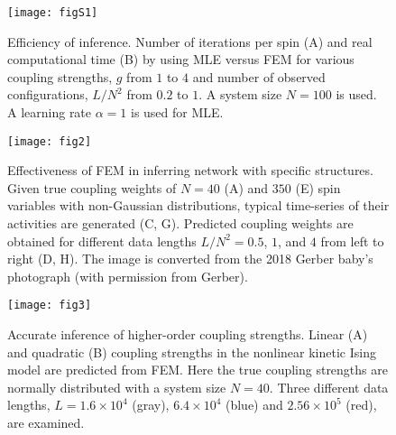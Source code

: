 \documentclass[prx,twocolumn,twoside,showpacs,superscriptaddress]{revtex4-1}
\begin{document}
\begin{figure}[h]
\centering
\texttt{[image: figS1]}
\caption{ \label{fig:figS1} Efficiency of inference. Number of iterations per spin (A) and real computational time (B) by using MLE versus FEM for various coupling strengths, $g$ from $1$ to $4$ and number of observed configurations, $L/N^2$ from $0.2$ to $1$. A system size $N=100$ is used. A learning rate $\alpha=1$ is used for MLE.
}
\end{figure}

\begin{figure*}
\centering
\texttt{[image: fig2]}
\caption{ \label{fig:fig2}Effectiveness of FEM in inferring network with specific structures. Given true coupling weights of $N=40$ (A) and  $350$ (E) spin variables with non-Gaussian distributions, typical time-series of their activities are generated (C, G). Predicted coupling weights are obtained for different data lengths $L/N^2=0.5$, $1$, and $4$ from left to right (D, H). The image is converted from the 2018 Gerber baby's photograph (with permission from Gerber).
}
\end{figure*}

\begin{figure}
\centering
\texttt{[image: fig3]}
\caption{ \label{fig:fig3}Accurate inference of higher-order coupling strengths.
Linear (A) and quadratic (B) coupling strengths in the nonlinear kinetic Ising model %
are predicted from FEM. Here the true coupling strengths are normally distributed with a system size $N=40$.
Three different data lengths, $L=1.6\times10^4$ (gray), $6.4\times10^4$ (blue) and $2.56\times10^5$ (red), are examined. 
}
\end{figure}
\end{document}
